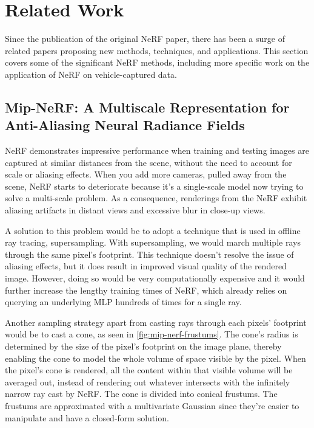 \section{Related Work}
Since the publication of the original NeRF paper, there has been a surge of related papers proposing new methods, techniques, and applications. This section covers some of the significant NeRF methods, including more specific work on the application of NeRF on vehicle-captured data.

\subsection[Mip-NeRF]{Mip-NeRF: A Multiscale Representation for Anti-Aliasing Neural Radiance Fields} \label{sec:mipnerf}
NeRF demonstrates impressive performance when training and testing images are captured at similar distances from the scene, without the need to account for scale or aliasing effects. When you add more cameras, pulled away from the scene, NeRF starts to deteriorate because it's a single-scale model now trying to solve a multi-scale problem. As a consequence, renderings from the NeRF exhibit aliasing artifacts in distant views and excessive blur in close-up views.

A solution to this problem would be to adopt a technique that is used in offline ray tracing, supersampling. With supersampling, we would march multiple rays through the same pixel's footprint. This technique doesn't resolve the issue of aliasing effects, but it does result in improved visual quality of the rendered image. However, doing so would be very computationally expensive and it would further increase the lengthy training times of NeRF, which already relies on querying an underlying MLP hundreds of times for a single ray.

Another sampling strategy apart from casting rays through each pixels' footprint would be to cast a cone, as seen in \autoref{fig:mip-nerf-frustums}. The cone's radius is determined by the size of the pixel's footprint on the image plane, thereby enabling the cone to model the whole volume of space visible by the pixel. When the pixel's cone is rendered, all the content within that visible volume will be averaged out, instead of rendering out whatever intersects with the infinitely narrow ray cast by NeRF. The cone is divided into conical frustums. The frustums are approximated with a multivariate Gaussian since they're easier to manipulate and have a closed-form solution.

